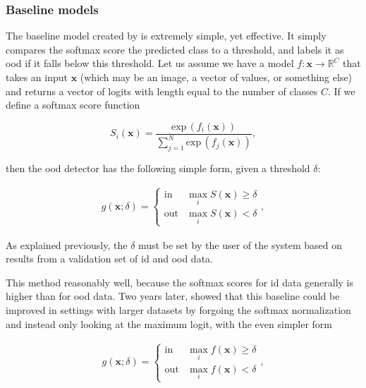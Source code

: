 \documentclass[UKenglish]{uiomasterthesis} %
\newcommand{\R}{\mathbb{R}}
\theoremstyle{definition}
\begin{document}
\subsubsection{Baseline models} \label{section:background_baselines}

The baseline model created by \cite{oodbaseline} is extremely simple, yet effective. It simply compares the softmax score the predicted class to a threshold, and labels it as \ac{ood} if it falls below this threshold. Let us assume we have a model $f: \bm{x} \rightarrow \R^C$ that takes an input $\bm{x}$ (which may be an image, a vector of values, or something else) and returns a vector of logits with length equal to the number of classes $C$. If we define a softmax score function 

\begin{equation}
    S_i(\bm{x}) = \frac{\text{exp} \, (f_i(\bm{x}))}{\sum^N_{j=1} \text{exp} \, (f_j(\bm{x}))},
\label{softmax}
\end{equation}

then the \ac{ood} detector has the following simple form, given a threshold $\delta$:

\begin{align}
\label{eq:msp}
    g(\bm{x}; \delta)=\begin{cases} 
        \text{in } & \max_i S(\bm{x})\ge \delta \\
        \text{out} & \max_i S(\bm{x}) < \delta 
   \end{cases},
\end{align}

As explained previously, the $\delta$ must be set by the user of the system based on results from a validation set of \ac{id} and \ac{ood} data.

This method reasonably well, because the softmax scores for \ac{id} data generally is higher than for \ac{ood} data. Two years later, \cite{mls} showed that this baseline could be improved in settings with larger datasets by forgoing the softmax normalization and instead only looking at the maximum logit, with the even simpler form

\begin{align}
\label{eq:mls}
    g(\bm{x}; \delta)=\begin{cases} 
        \text{in } & \max_i f(\bm{x})\ge \delta \\
        \text{out} & \max_i f(\bm{x}) < \delta 
   \end{cases},
\end{align}
\end{document}
